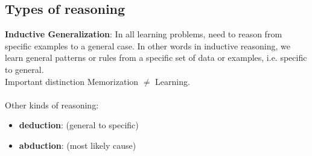 \documentclass[12pt, a4paper]{book}
\begin{document}
\subsection{Types of reasoning}
\textbf{Inductive Generalization}: In all learning problems, need to reason from specific examples to a general case. In other words in inductive reasoning, we learn general patterns or rules from a specific set of data or examples, i.e. specific to general.\\
Important distinction Memorization $\neq$ Learning.\\\\
Other kinds of reasoning:
\begin{itemize}
    \item \textbf{deduction}: (general to specific)
    \item \textbf{abduction}: (most likely cause)
\end{itemize}
\end{document}
